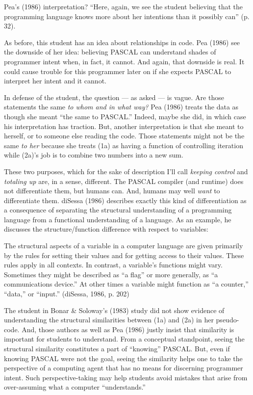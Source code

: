 Pea's (1986) interpretation? ``Here, again, we see the student believing
that the programming language knows more about her intentions than it
possibly can'' (p. 32).

As before, this student has an idea about relationships in code. Pea
(1986) see the downside of her idea: believing PASCAL can understand
shades of programmer intent when, in fact, it cannot. And again, that
downside is real. It could cause trouble for this programmer later on if
she expects PASCAL to interpret her intent and it cannot.

In defense of the student, the question --- as asked --- is vague. Are
those statements the same \emph{to whom and in what way?} Pea (1986)
treats the data as though she meant ``the same to PASCAL.'' Indeed,
maybe she did, in which case his interpretation has traction. But,
another interpretation is that she meant to herself, or to someone else
reading the code. Those statements might not be the same \emph{to her}
because she treats (1a) as having a function of controlling iteration
while (2a)'s job is to combine two numbers into a new sum.

These two purposes, which for the sake of description I'll call
\emph{keeping control} and \emph{totaling up} are, in a sense,
different. The PASCAL compiler (and runtime) does not differentiate
them, but humans can. And, humans may well \emph{want} to differentiate
them. diSessa (1986) describes exactly this kind of differentiation as a
consequence of separating the structural understanding of a programming
language from a functional understanding of a language. As an example,
he discusses the structure/function difference with respect to
variables:

The structural aspects of a variable in a computer language are given
primarily by the rules for setting their values and for getting access
to their values. These rules apply in all contexts. In contrast, a
variable's functions might vary. Sometimes they might be described as
``a flag'' or more generally, as ``a communications device.'' At other
times a variable might function as ``a counter,'' ``data,'' or
``input.'' (diSessa, 1986, p. 202)

The student in Bonar \& Soloway's (1983) study did not show evidence of
understanding the structural similarities between (1a) and (2a) in her
pseudo-code. And, those authors as well as Pea (1986) justly insist that
similarity is important for students to understand. From a conceptual
standpoint, seeing the structural similarity constitutes a part of
``knowing'' PASCAL. But, even if knowing PASCAL were not the goal,
seeing the similarity helps one to take the perspective of a computing
agent that has no means for discerning programmer intent. Such
perspective-taking may help students avoid mistakes that arise from
over-assuming what a computer ``understands.''

